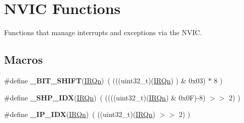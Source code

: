 \hypertarget{group___c_m_s_i_s___core___n_v_i_c_functions}{}\section{N\+V\+I\+C Functions}
\label{group___c_m_s_i_s___core___n_v_i_c_functions}


Functions that manage interrupts and exceptions via the N\+V\+I\+C.  


\subsection*{Macros}
\begin{DoxyCompactItemize}
\item 
\hypertarget{group___c_m_s_i_s___core___n_v_i_c_functions_ga53c75b28823441c6153269f0ecbed878}{}\#define {\bfseries \+\_\+\+B\+I\+T\+\_\+\+S\+H\+I\+F\+T}(\hyperlink{group___s_a_m_l21_e18_a__cmsis_ga666eb0caeb12ec0e281415592ae89083}{I\+R\+Qn})~(  (((uint32\+\_\+t)(\hyperlink{group___s_a_m_l21_e18_a__cmsis_ga666eb0caeb12ec0e281415592ae89083}{I\+R\+Qn})       )    \&  0x03) $\ast$ 8 )\label{group___c_m_s_i_s___core___n_v_i_c_functions_ga53c75b28823441c6153269f0ecbed878}

\item 
\hypertarget{group___c_m_s_i_s___core___n_v_i_c_functions_gaee4f7eb5d7e770ad51489dbceabb1755}{}\#define {\bfseries \+\_\+\+S\+H\+P\+\_\+\+I\+D\+X}(\hyperlink{group___s_a_m_l21_e18_a__cmsis_ga666eb0caeb12ec0e281415592ae89083}{I\+R\+Qn})~( ((((uint32\+\_\+t)(\hyperlink{group___s_a_m_l21_e18_a__cmsis_ga666eb0caeb12ec0e281415592ae89083}{I\+R\+Qn}) \& 0x0\+F)-\/8) $>$$>$    2)     )\label{group___c_m_s_i_s___core___n_v_i_c_functions_gaee4f7eb5d7e770ad51489dbceabb1755}

\item 
\hypertarget{group___c_m_s_i_s___core___n_v_i_c_functions_ga370ec4b1751a6a889d849747df3763a9}{}\#define {\bfseries \+\_\+\+I\+P\+\_\+\+I\+D\+X}(\hyperlink{group___s_a_m_l21_e18_a__cmsis_ga666eb0caeb12ec0e281415592ae89083}{I\+R\+Qn})~(   ((uint32\+\_\+t)(\hyperlink{group___s_a_m_l21_e18_a__cmsis_ga666eb0caeb12ec0e281415592ae89083}{I\+R\+Qn})            $>$$>$    2)     )\label{group___c_m_s_i_s___core___n_v_i_c_functions_ga370ec4b1751a6a889d849747df3763a9}

\end{DoxyCompactItemize}
